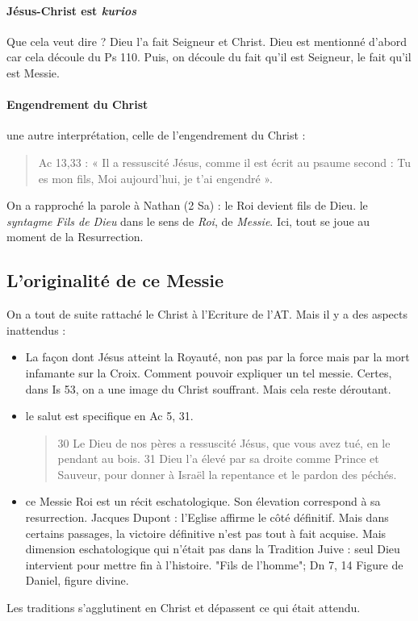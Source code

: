 \paragraph{Jésus-Christ est \emph{kurios}} Que cela veut dire ? Dieu l'a fait Seigneur et Christ. Dieu est mentionné d'abord car cela découle du Ps 110. Puis, on découle du fait qu'il est Seigneur, le fait qu'il est Messie. 

\paragraph{Engendrement du Christ}  une autre interprétation, celle de l'engendrement du Christ :  
\begin{quote}
Ac 13,33 : « Il a ressuscité Jésus, comme il est écrit au psaume second
: Tu es mon fils, Moi aujourd'hui, je t'ai engendré ».
\end{quote}
On a rapproché la parole à Nathan (2 Sa) : le Roi devient fils de Dieu. le \emph{syntagme} \textit{Fils de Dieu} dans le sens de \textit{Roi}, de \textit{Messie}. 
Ici, tout se joue au moment de la Resurrection.



 
     
    \subsection{L'originalité de ce Messie}

On a tout de suite rattaché le Christ à l'Ecriture de l'AT. Mais il y a des aspects inattendus : 
\begin{itemize}
    \item La façon dont Jésus atteint la Royauté, non pas par la force mais par la mort infamante sur la Croix. Comment pouvoir expliquer un tel messie. Certes, dans Is 53, on a une image du Christ souffrant. Mais cela reste déroutant.
    \item le salut est specifique en Ac 5, 31. 
    \begin{quote}
        30 Le Dieu de nos pères a ressuscité Jésus, que vous avez tué, en le pendant au bois.
31 Dieu l'a élevé par sa droite comme Prince et Sauveur, pour donner à Israël la repentance et le pardon des péchés.
    \end{quote}
    \item ce Messie Roi est un récit eschatologique. Son élevation correspond à sa resurrection.
    Jacques Dupont : l'Eglise affirme le côté définitif. Mais dans certains passages, la victoire définitive n'est pas tout à fait acquise. Mais dimension eschatologique qui n'était pas dans la Tradition Juive : seul Dieu intervient pour mettre fin à l'histoire. 
    "Fils de l'homme"; Dn 7, 14 Figure de Daniel,  figure divine. 
\end{itemize}   
Les traditions s'agglutinent en Christ et dépassent ce qui était attendu. 


